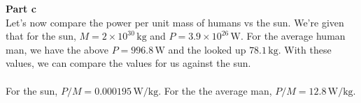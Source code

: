 \documentclass[12pt]{article}
\begin{document}
\begin{flushleft}
\textbf{Part c}\\
Let's now compare the power per unit mass of humans vs the sun.
We're given that for the sun, $M=2\times10^{30}\,\text{kg}$ and $P=3.9\times10^{26}\,\text{W}$.
For the average human man, we have the above $P=996.8\,\text{W}$ and the looked up $78.1\,\text{kg}$.
With these values, we can compare the values for us against the sun.\\~\\

For the sun, $P/M=0.000195\,\text{W/kg}$.
For the the average man, $P/M=12.8\,\text{W/kg}$.






\end{flushleft}
\end{document}
